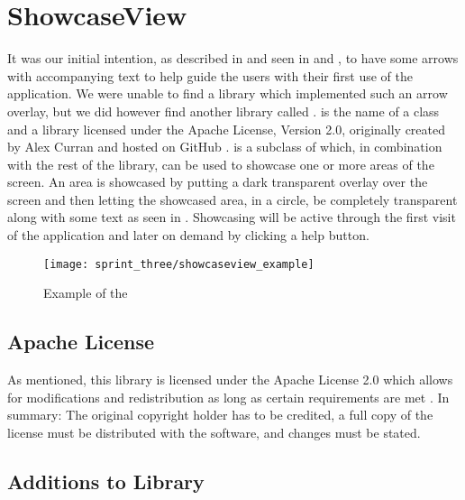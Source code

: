 
\section{ShowcaseView}
\label{sec:showcaseview}

It was our initial intention, as described in  and seen in  and , to have some arrows with accompanying text to help guide the users with their first use of the application. We were unable to find a library which implemented such an arrow overlay, but we did however find another library called .  is the name of a class and a library licensed under the Apache License, Version 2.0, originally created by Alex Curran and hosted on GitHub \parencite{showcaseview_by_alex_curran}.  is a subclass of  which, in combination with the rest of the library, can be used to showcase one or more areas of the screen. An area is showcased by putting a dark transparent overlay over the screen and then letting the showcased area, in a circle, be completely transparent along with some text as seen in . Showcasing will be active through the first visit of the application and later on demand by clicking a help button. \\

\begin{figure}[!htbp]
    \centering
    \texttt{[image: sprint\_three/showcaseview\_example]}
    \caption{Example of the }
    \label{fig:showcaseview_example}
\end{figure}

\subsection{Apache License}
As mentioned, this library is licensed under the Apache License 2.0 which allows for modifications and redistribution as long as certain requirements are met \parencite{apache2license}. In summary: The original copyright holder has to be credited, a full copy of the license must be distributed with the software, and changes must be stated.

\subsection{Additions to Library}

